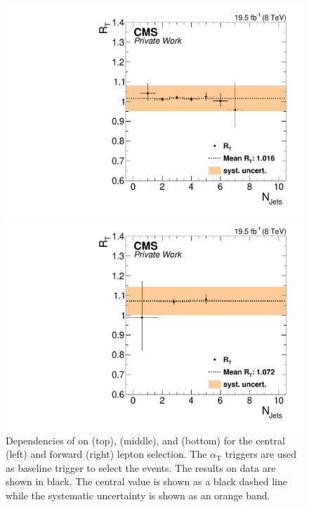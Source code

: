 \begin{figure}[htbp]
\begin{minipage}[t]{0.49\textwidth}
  \includegraphics[width=\textwidth]{plots/BG/trigger/Triggereff_SFvsOF_Syst_AlphaT_HighHTExclusiveCentral_Full2012_NJets_None.pdf}
\end{minipage}
\begin{minipage}[t]{0.49\textwidth}
\includegraphics[width=\textwidth]{plots/BG/trigger/Triggereff_SFvsOF_Syst_AlphaT_HighHTExclusiveForward_Full2012_NJets_None.pdf}
\end{minipage}
\caption{Dependencies of \RT on \mll (top), \MET (middle), and \njets (bottom) for the central (left) and forward (right) lepton selection. The $\alpha_{\mathrm{T}}$ triggers are used as baseline trigger to select the events. The results on data are shown in black. The central value is shown as a black dashed line while the systematic uncertainty is shown as an orange band.}
\label{fig:RTDependencies}
\end{figure} 
